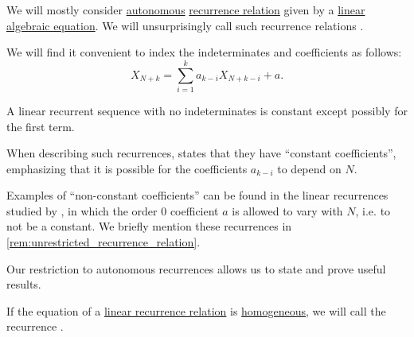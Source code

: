 \begin{definition}\label{def:linear_recurrence}
  We will mostly consider \hyperref[def:recurrence_relation/autonomous]{autonomous} \hyperref[def:recurrence_relation]{recurrence relation} given by a \hyperref[tab:def:polynomial_degree]{linear} \hyperref[def:polynomial_equation]{algebraic equation}. We will unsurprisingly call such recurrence relations .

  We will find it convenient to index the indeterminates and coefficients as follows:
  \begin{equation}\label{eq:def:linear_recurrence}
    X_{N+k} = \sum_{i=1}^k a_{k-i} X_{N+k-i} + a.
  \end{equation}
\end{definition}
\begin{comments}
  \item A linear recurrent sequence with no indeterminates is constant except possibly for the first term.

  \item When describing such recurrences, \textcite[def. 8.2.1]{Rosen2019DiscreteMathematics} states that they have \enquote{constant coefficients}, emphasizing that it is possible for the coefficients \( a_{k-i} \) to depend on \( N \).

  Examples of \enquote{non-constant coefficients} can be found in the linear recurrences studied by \textcite{AkraBazzi1998Recurrences}, in which the order \( 0 \) coefficient \( a \) is allowed to vary with \( N \), i.e. to not be a constant. We briefly mention these recurrences in \cref{rem:unrestricted_recurrence_relation}.

  Our restriction to autonomous recurrences allows us to state and prove useful results.
\end{comments}

\begin{definition}\label{def:homogeneous_linear_recurrence}
  If the equation of a \hyperref[def:linear_recurrence]{linear recurrence relation} is \hyperref[def:homogeneous_equation]{homogeneous}, we will call the recurrence .
\end{definition}

